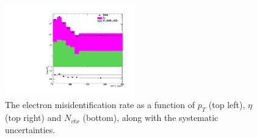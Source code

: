 \documentclass[thesis.tex]{subfiles}
\renewcommand\_{\textunderscore\allowbreak}
\begin{document}
\begin{figure}
  \centering
    \includegraphics[width=0.5\textwidth]{Figures/PLOT_ISRweight.pdf}
  \caption{The electron misidentification rate as a function of $p_T$ (top left), $\eta$ (top right) and $N_{vtx}$ (bottom), along with the systematic uncertainties.}
  \label{fig:apen-ISRJetPt}
\end{figure}
\end{document}
